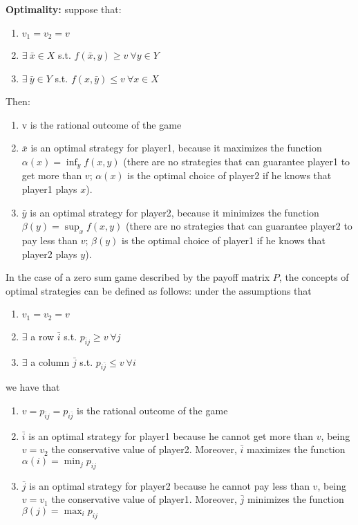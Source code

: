 \bigskip
\noindent \textbf{Optimality:} suppose that:
\begin{enumerate}
	\item $v_1 = v_2 = v$
	\item $\exists ~\bar{x} \in X$ s.t. $f(\bar{x},y) \geq v ~\forall y \in Y$
	\item $\exists ~\bar{y} \in Y$ s.t. $f(x,\bar{y}) \leq v ~\forall x \in X$
\end{enumerate}
Then:
\begin{enumerate}
	\item v is the rational outcome of the game
	\item $\bar{x}$ is an optimal strategy for player1, because it maximizes 
	the function $\alpha(x) = \inf_y f(x,y)$ (there are no strategies that can 
	guarantee player1 to get more than $v$; $\alpha(x)$ is the optimal choice 
	of player2 if he knows that player1 plays $x$).
	\item $\bar{y}$ is an optimal strategy for player2, because it minimizes 
	the function $\beta(y) = \sup_x f(x,y)$ (there are no strategies that can 
	guarantee player2 to pay less than $v$; $\beta(y)$ is the optimal choice 
	of player1 if he knows that player2 plays $y$).
\end{enumerate}

\noindent In the case of a zero sum game described by the payoff matrix $P$, 
the concepts of optimal strategies can be defined as follows: under the 
assumptions that 
\begin{enumerate}
	\item $v_1 = v_2 = v$
	\item $\exists$ a row $\bar{i}$ s.t. $p_{\bar{i}j} \geq v ~\forall j$
	\item $\exists$ a column $\bar{j}$ s.t. $p_{i\bar{j}} \leq v ~\forall i$
\end{enumerate}
we have that 
\begin{enumerate}
	\item $v = p_{\bar{i}j} = p_{i\bar{j}}$ is the rational outcome of the game
	\item $\bar{i}$ is an optimal strategy for player1 because he cannot get 
	more than $v$, being $v = v_2$ the conservative value of player2. Moreover, 
	$\bar{i}$ maximizes the function $\alpha(i) = \min_j p_{ij}$
	\item $\bar{j}$ is an optimal strategy for player2 because he cannot pay 
	less than $v$, being $v = v_1$ the conservative value of player1. Moreover, 
	$\bar{j}$ minimizes the function $\beta(j) = \max_i p_{ij}$
\end{enumerate}

